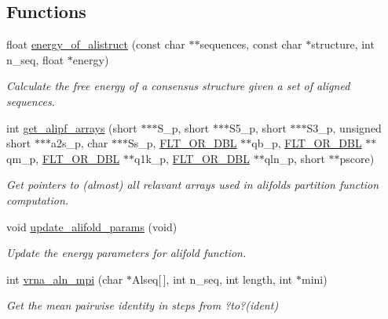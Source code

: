 \subsection*{Functions}
\begin{DoxyCompactItemize}
\item 
float \hyperlink{group__consensus__fold_ga1c48869c03b49a342bf4cbdd61900081}{energy\+\_\+of\+\_\+alistruct} (const char $\ast$$\ast$sequences, const char $\ast$structure, int n\+\_\+seq, float $\ast$energy)
\begin{DoxyCompactList}\small\item\em Calculate the free energy of a consensus structure given a set of aligned sequences. \end{DoxyCompactList}\item 
int \hyperlink{group__consensus__fold_ga5349960075b1847720a2e9df021e2675}{get\+\_\+alipf\+\_\+arrays} (short $\ast$$\ast$$\ast$S\+\_\+p, short $\ast$$\ast$$\ast$S5\+\_\+p, short $\ast$$\ast$$\ast$S3\+\_\+p, unsigned short $\ast$$\ast$$\ast$a2s\+\_\+p, char $\ast$$\ast$$\ast$Ss\+\_\+p, \hyperlink{group__data__structures_ga31125aeace516926bf7f251f759b6126}{F\+L\+T\+\_\+\+O\+R\+\_\+\+D\+B\+L} $\ast$$\ast$qb\+\_\+p, \hyperlink{group__data__structures_ga31125aeace516926bf7f251f759b6126}{F\+L\+T\+\_\+\+O\+R\+\_\+\+D\+B\+L} $\ast$$\ast$qm\+\_\+p, \hyperlink{group__data__structures_ga31125aeace516926bf7f251f759b6126}{F\+L\+T\+\_\+\+O\+R\+\_\+\+D\+B\+L} $\ast$$\ast$q1k\+\_\+p, \hyperlink{group__data__structures_ga31125aeace516926bf7f251f759b6126}{F\+L\+T\+\_\+\+O\+R\+\_\+\+D\+B\+L} $\ast$$\ast$qln\+\_\+p, short $\ast$$\ast$pscore)
\begin{DoxyCompactList}\small\item\em Get pointers to (almost) all relavant arrays used in alifold\textquotesingle{}s partition function computation. \end{DoxyCompactList}\item 
void \hyperlink{group__consensus__fold_gac484c6bd429bafbd353b91044508d8e9}{update\+\_\+alifold\+\_\+params} (void)
\begin{DoxyCompactList}\small\item\em Update the energy parameters for alifold function. \end{DoxyCompactList}\item 
int \hyperlink{group__consensus__fold_ga20fd17bb27891009af7ce839f5386177}{vrna\+\_\+aln\+\_\+mpi} (char $\ast$Alseq\mbox{[}$\,$\mbox{]}, int n\+\_\+seq, int length, int $\ast$mini)
\begin{DoxyCompactList}\small\item\em Get the mean pairwise identity in steps from ?to?(ident) \end{DoxyCompactList}\item 

\end{DoxyCompactItemize}
